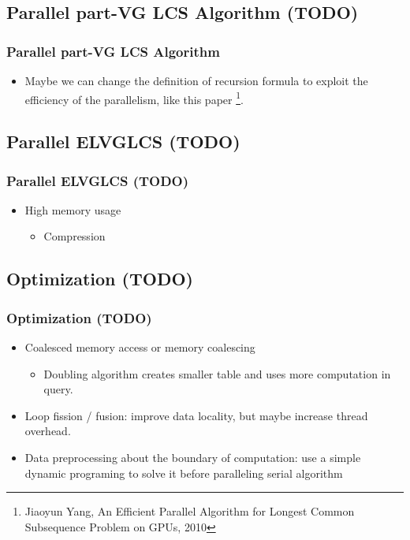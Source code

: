 \subsection{Parallel part-VG LCS Algorithm (TODO)}
\begin{frame}
	\frametitle{Parallel part-VG LCS Algorithm}
	\begin{itemize}
		\item Maybe we can change the definition of recursion formula to exploit the efficiency of the parallelism, like this paper
		\footnote{Jiaoyun Yang, An Efficient Parallel Algorithm for Longest Common Subsequence Problem on GPUs, 2010}.
	\end{itemize}
\end{frame}

\subsection{Parallel ELVGLCS (TODO)}
\begin{frame}
	\frametitle{Parallel ELVGLCS (TODO)}
	\begin{itemize}
		\item High memory usage 
			\begin{itemize}
				\item Compression
			\end{itemize}
	\end{itemize}
\end{frame}

\subsection{Optimization (TODO)}
\begin{frame}
	\frametitle{Optimization (TODO)}
	\begin{itemize}
		\setlength\itemsep{1em}
		\item Coalesced memory access or memory coalescing
			\begin{itemize}
				\item Doubling algorithm creates smaller table
					and uses more computation in query.
			\end{itemize}
		\item Loop fission / fusion: improve data locality, 
			but maybe increase thread overhead.
		\item Data preprocessing about the boundary of computation: use a simple dynamic programing to solve it before paralleling serial algorithm
	\end{itemize}
\end{frame}